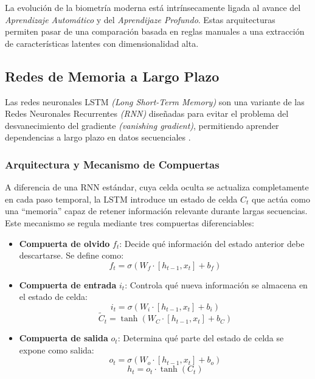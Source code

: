 La evolución de la biometría moderna está intrínsecamente ligada al avance del \textit{Aprendizaje Automático} y del \textit{Aprendijaze Profundo}. Estas arquitecturas permiten pasar de una comparación basada
en reglas manuales a una extracción de características latentes con dimensionalidad alta.

\subsection{Redes de Memoria a Largo Plazo}

Las redes neuronales LSTM \textit{(Long Short-Term Memory)} son una variante 
de las Redes Neuronales Recurrentes \textit{(RNN)} diseñadas para evitar el 
problema del desvanecimiento del gradiente \textit{(vanishing gradient)}, 
permitiendo aprender dependencias a largo plazo en datos secuenciales 
\cite{hochreiter1997lstm}.

\subsubsection{Arquitectura y Mecanismo de Compuertas}

A diferencia de una RNN estándar, cuya celda oculta se actualiza 
completamente en cada paso temporal, la LSTM introduce un estado de celda 
$C_t$ que actúa como una ``memoria'' capaz de retener información relevante 
durante largas secuencias. Este mecanismo se regula mediante tres compuertas 
diferenciables:

\begin{itemize}
    \item \textbf{Compuerta de olvido} $f_t$: Decide qué información del 
    estado anterior debe descartarse. Se define como:
    \begin{equation}
        f_t = \sigma(W_f \cdot [h_{t-1}, x_t] + b_f)
    \end{equation}

    \item \textbf{Compuerta de entrada} $i_t$: Controla qué nueva información 
    se almacena en el estado de celda:
    \begin{equation}
        i_t = \sigma(W_i \cdot [h_{t-1}, x_t] + b_i)
    \end{equation}
    \begin{equation}
        \tilde{C}_t = \tanh(W_C \cdot [h_{t-1}, x_t] + b_C)
    \end{equation}

    \item \textbf{Compuerta de salida} $o_t$: Determina qué parte del estado 
    de celda se expone como salida:
    \begin{equation}
        o_t = \sigma(W_o \cdot [h_{t-1}, x_t] + b_o)
    \end{equation}
    \begin{equation}
        h_t = o_t \cdot \tanh(C_t)
    \end{equation}
\end{itemize}

